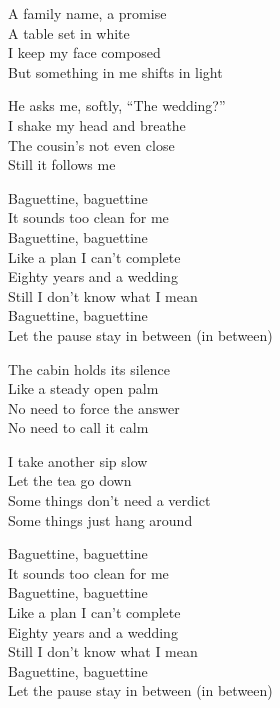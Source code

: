 \begin{lyrics}
A family name, a promise\\
A table set in white\\
I keep my face composed\\
But something in me shifts in light

He asks me, softly, “The wedding?”\\
I shake my head and breathe\\
The cousin’s not even close\\
Still it follows me

Baguettine, baguettine\\
It sounds too clean for me\\
Baguettine, baguettine\\
Like a plan I can’t complete\\
Eighty years and a wedding\\
Still I don’t know what I mean\\
Baguettine, baguettine\\
Let the pause stay in between (in between)

The cabin holds its silence\\
Like a steady open palm\\
No need to force the answer\\
No need to call it calm

I take another sip slow\\
Let the tea go down\\
Some things don’t need a verdict\\
Some things just hang around

Baguettine, baguettine\\
It sounds too clean for me\\
Baguettine, baguettine\\
Like a plan I can’t complete\\
Eighty years and a wedding\\
Still I don’t know what I mean\\
Baguettine, baguettine\\
Let the pause stay in between (in between)
\end{lyrics}

